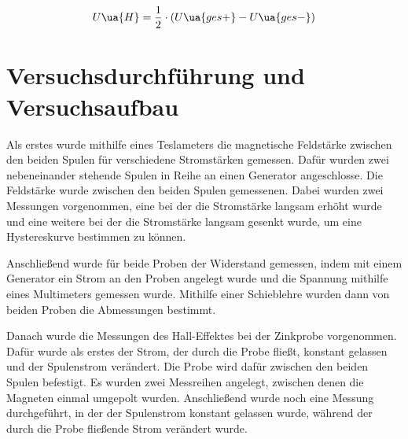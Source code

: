 \begin{equation}
  U\ua{H} = \frac{1}{2} \cdot ( U\ua{ges+} - U\ua{ges-} )
\end{equation}


\section{Versuchsdurchführung und Versuchsaufbau}

Als erstes wurde mithilfe eines Teslameters die magnetische Feldstärke zwischen
den beiden Spulen für verschiedene Stromstärken gemessen. Dafür wurden zwei nebeneinander
stehende Spulen in Reihe an einen Generator angeschlosse. Die Feldstärke wurde
zwischen den beiden Spulen gemessenen. Dabei wurden zwei Messungen
vorgenommen, eine bei der die Stromstärke langsam erhöht wurde und eine weitere
bei der die Stromstärke langsam gesenkt wurde, um eine Hystereskurve bestimmen
zu können.

Anschließend wurde für beide Proben der Widerstand gemessen, indem mit einem Generator
ein Strom an den Proben angelegt wurde und die Spannung mithilfe eines Multimeters
gemessen wurde. Mithilfe einer Schieblehre wurden dann
von beiden Proben die Abmessungen bestimmt.

Danach wurde die Messungen des Hall-Effektes bei der Zinkprobe vorgenommen.
Dafür wurde als  erstes der Strom, der durch die Probe fließt, konstant gelassen
und der Spulenstrom verändert. Die Probe wird dafür zwischen den beiden Spulen
befestigt. Es wurden zwei Messreihen angelegt, zwischen denen
die Magneten einmal umgepolt wurden. Anschließend wurde noch eine Messung durchgeführt,
in der der Spulenstrom konstant gelassen wurde, während der durch die Probe fließende
Strom verändert wurde.

